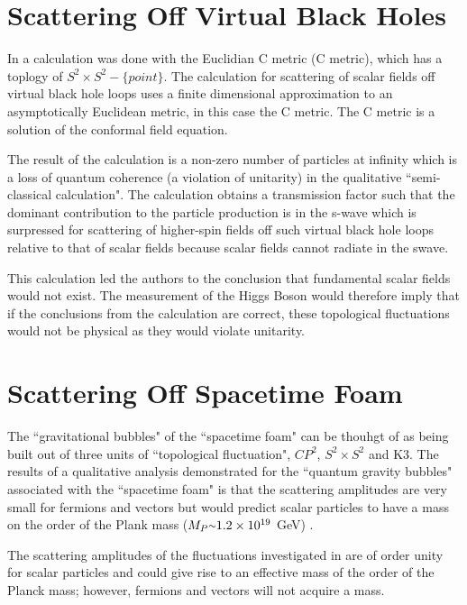 \documentclass[%
 reprint,
 amsmath,amssymb,
 aps,
]{revtex4-1}
\begin{document}
\section{Scattering Off Virtual Black Holes}

In \cite{virtualblackholes} a calculation was done with the Euclidian C metric (C metric), which has a toplogy of $S^2 \times S^2 - \{point\}$. The calculation for scattering of scalar fields off virtual black hole loops uses a finite dimensional approximation to an asymptotically Euclidean metric, in this case the C metric. The C metric is a solution of the conformal field equation.

The result of the calculation is a non-zero number of particles at infinity which is a loss of quantum coherence (a violation of unitarity) in the qualitative ``semi-classical calculation". The calculation obtains a transmission factor such that the dominant contribution to the particle production is in the s-wave which is surpressed for scattering of higher-spin fields off such virtual black hole loops relative to that of scalar fields because scalar fields cannot radiate in the s\textemdash wave.

This calculation led the authors to the conclusion that fundamental scalar fields would not exist. The measurement of the Higgs Boson would therefore imply that if the conclusions from the calculation are correct, these topological fluctuations would not be physical as they would violate unitarity.

\section{Scattering Off Spacetime Foam}

The ``gravitational bubbles" of the ``spacetime foam" can be thouhgt of as being built out of three units of ``topological fluctuation", $CP^2$, $S^2 \times S^2$ and K3. The results of a qualitative analysis demonstrated for the ``quantum gravity bubbles" \cite{qgbubbles} associated with the ``spacetime foam" is that the scattering amplitudes are very small for fermions and vectors but would predict scalar particles to have a mass on the order of the Plank mass ($M_P \raise.17ex\hbox{$\scriptstyle\sim$} 1.2 \times 10^{19}$ GeV) \cite{virtualfoam}.

The scattering amplitudes of the fluctuations investigated in \cite{virtualfoam} are of order unity for scalar particles and could give rise to an effective mass of the order of the Planck mass; however, fermions and vectors will not acquire a mass.
\end{document}
